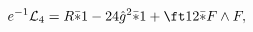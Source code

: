\begin{equation}
e^{-1}{\cal L}_4 = R\bar *1 -24\hat g^2\bar*1 +\ft12\bar*F\wedge F,
\label{eq:d4n2lag3}
\end{equation}

